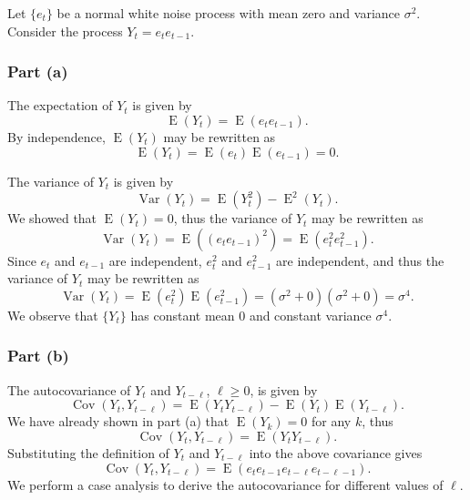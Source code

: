 \documentclass[
]{article}
\begin{document}
Let \(\{e_t\}\) be a normal white noise process with mean zero and
variance \(\sigma^2\). Consider the process \(Y_t = e_t e_{t-1}\).

\hypertarget{part-a-1}{%
\subsubsection{Part (a)}\label{part-a-1}}


The expectation of \(Y_t\) is given by \[
   \operatorname{E}(Y_t) = \operatorname{E}(e_t e_{t-1}).
\] By independence, \(\operatorname{E}(Y_t)\) may be rewritten as \[
   \operatorname{E}(Y_t) = \operatorname{E}(e_t) \operatorname{E}(e_{t-1}) = 0.
\]

The variance of \(Y_t\) is given by \[
   \operatorname{Var}(Y_t) = \operatorname{E}(Y_t^2) - \operatorname{E}^2(Y_t).
\] We showed that \(\operatorname{E}(Y_t) = 0\), thus the variance of
\(Y_t\) may be rewritten as \[
   \operatorname{Var}(Y_t) = \operatorname{E}((e_t e_{t-1})^2) = \operatorname{E}(e_t^2 e_{t-1}^2).
\] Since \(e_t\) and \(e_{t-1}\) are independent, \(e_t^2\) and
\(e_{t-1}^2\) are independent, and thus the variance of \(Y_t\) may be
rewritten as \[
   \operatorname{Var}(Y_t) = \operatorname{E}(e_t^2) \operatorname{E}(e_{t-1}^2) = (\sigma^2 + 0)(\sigma^2 + 0) = \sigma^4.
\] We observe that \(\{Y_t\}\) has constant mean \(0\) and constant
variance \(\sigma^4\).

\hypertarget{part-b-1}{%
\subsubsection{Part (b)}\label{part-b-1}}


The autocovariance of \(Y_t\) and \(Y_{t-\ell}\), \(\ell \geq 0\), is
given by \[
   \operatorname{Cov}(Y_t,Y_{t-\ell}) = \operatorname{E}(Y_t Y_{t-\ell}) - \operatorname{E}(Y_t) \operatorname{E}(Y_{t-\ell}).
\] We have already shown in part (a) that \(\operatorname{E}(Y_k) = 0\)
for any \(k\), thus \[
   \operatorname{Cov}(Y_t,Y_{t-\ell}) = \operatorname{E}(Y_t Y_{t-\ell}).
\] Substituting the definition of \(Y_t\) and \(Y_{t-\ell}\) into the
above covariance gives \[
   \operatorname{Cov}(Y_t,Y_{t-\ell}) = \operatorname{E}(e_t e_{t-1} e_{t-\ell} e_{t - \ell - 1}).
\] We perform a case analysis to derive the autocovariance for different
values of \(\ell\).
\end{document}

